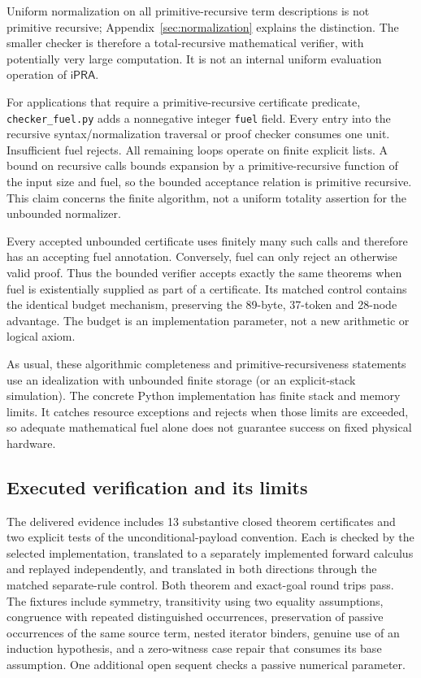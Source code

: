 \documentclass[11pt,letterpaper]{article}
\theoremstyle{definition}\newtheorem{definition}[theorem]{Definition}
\theoremstyle{remark}\newtheorem{remark}[theorem]{Remark}
\newcommand{\ipra}{\mathsf{iPRA}}
\begin{document}
Uniform normalization on all primitive-recursive term descriptions is not
primitive recursive; Appendix~\ref{sec:normalization} explains the distinction.
The smaller checker is therefore a total-recursive mathematical verifier,
with potentially very large computation. It is not an internal uniform
evaluation operation of $\ipra$.

For applications that require a primitive-recursive certificate predicate,
\texttt{checker\_fuel.py} adds a nonnegative integer \texttt{fuel} field.
Every entry into the recursive syntax/normalization traversal or proof
checker consumes one unit. Insufficient fuel rejects. All remaining loops
operate on finite explicit lists. A bound on recursive calls bounds expansion
by a primitive-recursive function of the input size and fuel, so the bounded
acceptance relation is primitive recursive. This claim concerns the finite
algorithm, not a uniform totality assertion for the unbounded normalizer.

Every accepted unbounded certificate uses finitely many such calls and
therefore has an accepting fuel annotation. Conversely, fuel can only reject
an otherwise valid proof. Thus the bounded verifier accepts exactly the same
theorems when fuel is existentially supplied as part of a certificate.
Its matched control contains the identical budget mechanism, preserving the
89-byte, 37-token and 28-node advantage. The budget is an implementation
parameter, not a new arithmetic or logical axiom.

As usual, these algorithmic completeness and primitive-recursiveness statements
use an idealization with unbounded finite storage (or an explicit-stack
simulation). The concrete Python implementation has finite stack and memory
limits. It catches resource exceptions and rejects when those limits are
exceeded, so adequate mathematical fuel alone does not guarantee success on
fixed physical hardware.

\subsection{Executed verification and its limits}

The delivered evidence includes 13 substantive closed theorem certificates
and two explicit tests of the unconditional-payload convention. Each is
checked by the selected implementation, translated to a separately implemented
forward calculus and replayed independently, and translated in both directions
through the matched separate-rule control. Both theorem and exact-goal
round trips pass. The fixtures include symmetry, transitivity using two
equality assumptions, congruence with repeated distinguished occurrences,
preservation of passive occurrences of the same source term, nested iterator
binders, genuine use of an induction hypothesis, and a zero-witness case repair
that consumes its base assumption. One additional open sequent checks a
passive numerical parameter.
\end{document}
